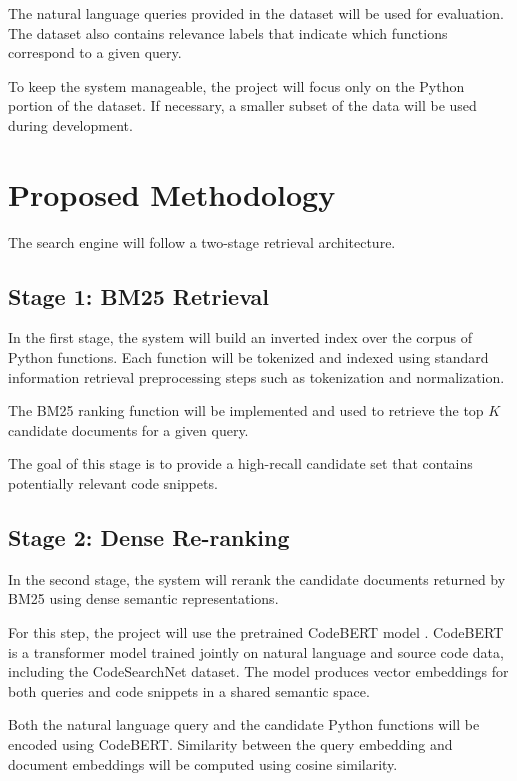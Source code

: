 \documentclass[11pt,a4paper]{article}
\begin{document}
The natural language queries provided in the dataset will be used for evaluation. The dataset also contains relevance labels that indicate which functions correspond to a given query.

To keep the system manageable, the project will focus only on the Python portion of the dataset. If necessary, a smaller subset of the data will be used during development.

\section{Proposed Methodology}

The search engine will follow a two-stage retrieval architecture.

\subsection{Stage 1: BM25 Retrieval}

In the first stage, the system will build an inverted index over the corpus of Python functions. Each function will be tokenized and indexed using standard information retrieval preprocessing steps such as tokenization and normalization.

The BM25 ranking function will be implemented and used to retrieve the top $K$ candidate documents for a given query.

The goal of this stage is to provide a high-recall candidate set that contains potentially relevant code snippets.

\subsection{Stage 2: Dense Re-ranking}

In the second stage, the system will rerank the candidate documents returned by BM25 using dense semantic representations.

For this step, the project will use the pretrained CodeBERT model \cite{codebert}. CodeBERT is a transformer model trained jointly on natural language and source code data, including the CodeSearchNet dataset. The model produces vector embeddings for both queries and code snippets in a shared semantic space.

Both the natural language query and the candidate Python functions will be encoded using CodeBERT. Similarity between the query embedding and document embeddings will be computed using cosine similarity.
\end{document}
